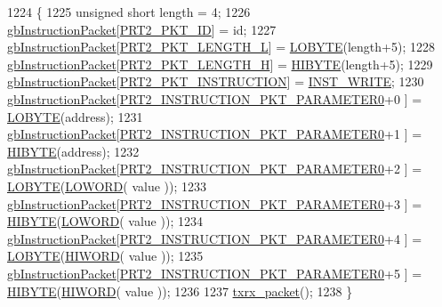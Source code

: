 \begin{DoxyCode}
1224 \{
1225     \textcolor{keywordtype}{unsigned} \textcolor{keywordtype}{short} length = 4;
1226     \hyperlink{classdynamixel2_a298efe9115fdbf77019af1001e801fb4}{gbInstructionPacket}[\hyperlink{dynamixel_8h_a3524b007f8f56ad0d80c1d0caf7e968a}{PRT2\_PKT\_ID}]                      = id;
1227     \hyperlink{classdynamixel2_a298efe9115fdbf77019af1001e801fb4}{gbInstructionPacket}[\hyperlink{dynamixel_8h_a9e77ab568957b64786c810967dec8b0c}{PRT2\_PKT\_LENGTH\_L}]                  = 
      \hyperlink{dynamixel_8h_a04c0416272e5c07bdf955d803a21688e}{LOBYTE}(length+5);
1228     \hyperlink{classdynamixel2_a298efe9115fdbf77019af1001e801fb4}{gbInstructionPacket}[\hyperlink{dynamixel_8h_a5ea18a21d722bf72217d5408c4d2a868}{PRT2\_PKT\_LENGTH\_H}]                  = 
      \hyperlink{dynamixel_8h_a75c5b5f21e837e80c0feb4da9a421f87}{HIBYTE}(length+5);
1229     \hyperlink{classdynamixel2_a298efe9115fdbf77019af1001e801fb4}{gbInstructionPacket}[\hyperlink{dynamixel_8h_aece9dd9d7c0fa1714d53c568865d79ad}{PRT2\_PKT\_INSTRUCTION}]                = 
      \hyperlink{dynamixel_8h_a1c304d06170982719fd605a87c9101f0}{INST\_WRITE};
1230     \hyperlink{classdynamixel2_a298efe9115fdbf77019af1001e801fb4}{gbInstructionPacket}[\hyperlink{dynamixel_8h_a349ccb89ae957bdcc16856ec8e2dcb00}{PRT2\_INSTRUCTION\_PKT\_PARAMETER0}+0
      ]    = \hyperlink{dynamixel_8h_a04c0416272e5c07bdf955d803a21688e}{LOBYTE}(address);
1231     \hyperlink{classdynamixel2_a298efe9115fdbf77019af1001e801fb4}{gbInstructionPacket}[\hyperlink{dynamixel_8h_a349ccb89ae957bdcc16856ec8e2dcb00}{PRT2\_INSTRUCTION\_PKT\_PARAMETER0}+1
      ]    = \hyperlink{dynamixel_8h_a75c5b5f21e837e80c0feb4da9a421f87}{HIBYTE}(address);
1232     \hyperlink{classdynamixel2_a298efe9115fdbf77019af1001e801fb4}{gbInstructionPacket}[\hyperlink{dynamixel_8h_a349ccb89ae957bdcc16856ec8e2dcb00}{PRT2\_INSTRUCTION\_PKT\_PARAMETER0}+2
      ]    = \hyperlink{dynamixel_8h_a04c0416272e5c07bdf955d803a21688e}{LOBYTE}(\hyperlink{dynamixel_8h_a00be6c40bc7a1297ada4d47a028066b8}{LOWORD}( value ));
1233     \hyperlink{classdynamixel2_a298efe9115fdbf77019af1001e801fb4}{gbInstructionPacket}[\hyperlink{dynamixel_8h_a349ccb89ae957bdcc16856ec8e2dcb00}{PRT2\_INSTRUCTION\_PKT\_PARAMETER0}+3
      ]    = \hyperlink{dynamixel_8h_a75c5b5f21e837e80c0feb4da9a421f87}{HIBYTE}(\hyperlink{dynamixel_8h_a00be6c40bc7a1297ada4d47a028066b8}{LOWORD}( value ));
1234     \hyperlink{classdynamixel2_a298efe9115fdbf77019af1001e801fb4}{gbInstructionPacket}[\hyperlink{dynamixel_8h_a349ccb89ae957bdcc16856ec8e2dcb00}{PRT2\_INSTRUCTION\_PKT\_PARAMETER0}+4
      ]    = \hyperlink{dynamixel_8h_a04c0416272e5c07bdf955d803a21688e}{LOBYTE}(\hyperlink{dynamixel_8h_aeb28b2d61bd674900a89bfb77e28ae07}{HIWORD}( value ));
1235     \hyperlink{classdynamixel2_a298efe9115fdbf77019af1001e801fb4}{gbInstructionPacket}[\hyperlink{dynamixel_8h_a349ccb89ae957bdcc16856ec8e2dcb00}{PRT2\_INSTRUCTION\_PKT\_PARAMETER0}+5
      ]    = \hyperlink{dynamixel_8h_a75c5b5f21e837e80c0feb4da9a421f87}{HIBYTE}(\hyperlink{dynamixel_8h_aeb28b2d61bd674900a89bfb77e28ae07}{HIWORD}( value ));
1236     
1237     \hyperlink{classdynamixel2_a2cccd455a52afe99a37b249aa834cdc7}{txrx\_packet}();
1238 \}
\end{DoxyCode}
